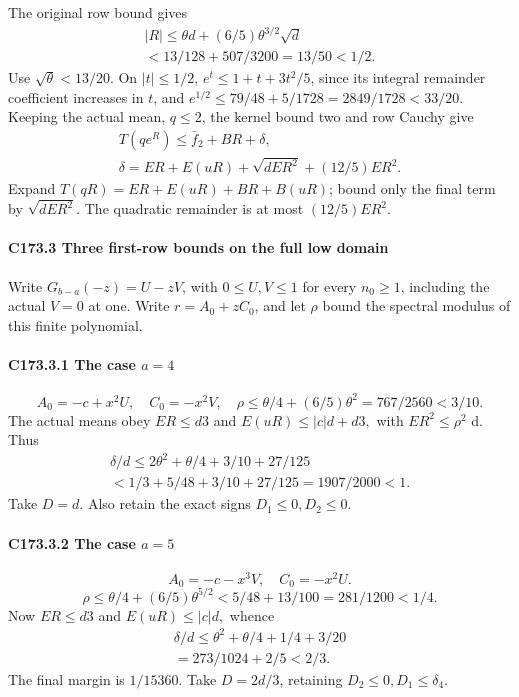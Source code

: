 The original row bound gives
\[
\begin{gathered}
|R|\le\theta d+(6/5)\theta^{3/2}\sqrt d\\
<13/128+507/3200=13/50<1/2.
\end{gathered}\tag{C173.T183.10}
\]
Use \(\sqrt\theta<13/20\). On \(|t|\le1/2\), \(e^t\le1+t+3t^2/5\), since its integral remainder coefficient increases in \(t\), and \(e^{1/2}\le79/48+5/1728=2849/1728<33/20\). Keeping the actual mean, \(q\le2\), the kernel bound two and row Cauchy give
\[
\begin{gathered}
T(qe^R)\le \bar f_2+BR+\delta,\qquad\\
\delta=ER+E(uR)+\sqrt{dER^2}+(12/5)ER^2.
\end{gathered}\tag{C173.T183.11}
\]
Expand \(T(qR)=ER+E(uR)+BR+B(uR)\); bound only the final term by \(\sqrt{dER^2}\). The quadratic remainder is at most \((12/5)ER^2\).

\paragraph{C173.3 Three first-row bounds on the full low domain}

Write \(G_{b-a}(-z)=U-zV\), with \(0\le U,\allowbreak \allowbreak  V\le1\) for every \(n_0\ge1\), including the actual \(V=0\) at one. Write \(r=A_0+zC_0\), and let \(\rho\) bound the spectral modulus of this finite polynomial.

\paragraph{C173.3.1 The case \(a=4\)}

\[
A_0=-c+x^2U,\quad C_0=-x^2V,\quad
\rho\le\theta/4+(6/5)\theta^2=767/2560<3/10.
\]
The actual means obey \(ER\le d3\) and \(E(uR)\le |c|d+d3,\allowbreak \) with \(ER^2\le \rho^2\) d. Thus
\[
\begin{gathered}
\delta/d\le2\theta^2+\theta/4+3/10+27/125\\
<1/3+5/48+3/10+27/125=1907/2000<1.
\end{gathered}\tag{C173.T183.12}
\]
Take \(D=d\). Also retain the exact signs \(D_1\le0,\allowbreak \allowbreak  D_2\le0\).

\paragraph{C173.3.2 The case \(a=5\)}

\[
A_0=-c-x^3V,\quad C_0=-x^2U.
\]
\[
\rho\le\theta/4+(6/5)\theta^{5/2}
<5/48+13/100=281/1200<1/4.
\]
Now \(ER\le d3\) and \(E(uR)\le |c|d,\allowbreak \) whence
\[
\begin{gathered}
\delta/d\le\theta^2+\theta/4+1/4+3/20\\
=273/1024+2/5<2/3.
\end{gathered}\tag{C173.T183.13}
\]
The final margin is \(1/15360\). Take \(D=2d/3\), retaining \(D_2\le0,\allowbreak \allowbreak  D_1\le \delta_4\).

